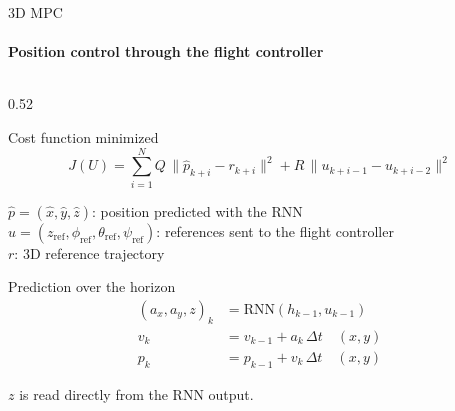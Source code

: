 \begin{frame}{3D MPC}
    \framesubtitle{Position control through the flight controller}

    \begin{columns}[T,onlytextwidth]
        \begin{column}{0.52\textwidth}
            \begin{block}{Cost function minimized}
                \footnotesize
                \setlength{\abovedisplayskip}{0pt}\setlength{\belowdisplayskip}{2pt}
                \[
                    J(U) = \sum_{i=1}^{N} Q\,\big\|\hat{p}_{k+i} - r_{k+i}\big\|^2
                    + R\,\big\|u_{k+i-1} - u_{k+i-2}\big\|^2
                \]
                {\scriptsize\raggedright
                $\hat{p}=(\hat{x}, \hat{y}, \hat{z})$: position predicted
                with the RNN\\
                $u = (z_{\mathrm{ref}}, \phi_{\mathrm{ref}},
                \theta_{\mathrm{ref}}, \psi_{\mathrm{ref}})$: references
                sent to the flight controller\\
                $r$: 3D reference trajectory\par}
            \end{block}

            \begin{block}{Prediction over the horizon}
                \footnotesize
                \setlength{\abovedisplayskip}{0pt}\setlength{\belowdisplayskip}{2pt}
                \begin{align*}
                    (a_{x}, a_{y}, z)_{k} &= \mathrm{RNN}(h_{k-1}, u_{k-1})\\
                    v_{k} &= v_{k-1} + a_{k}\,\Delta t \quad (x, y)\\
                    p_{k} &= p_{k-1} + v_{k}\,\Delta t \quad (x, y)
                \end{align*}
                {\scriptsize $z$ is read directly from the RNN output.\par}
            \end{block}
        \end{column}


\end{columns}
\end{frame}
